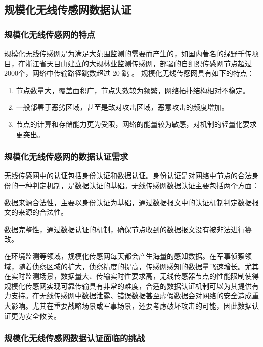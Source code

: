 \subsection{规模化无线传感网数据认证}
\subsubsection{规模化无线传感网的特点}
规模化无线传感网是为满足大范围监测的需要而产生的，如国内著名的绿野千传项目，在浙江省天目山建立的大规林业监测传感网，部署的自组织传感网节点超过2000个，网络中传输路径跳数超过 20 跳
。
规模化无线传感网具有如下的特点：
\begin{enumerate}\setlength{\itemsep}{-\itemsep}
  \item 节点数量大，覆盖面积广，节点失效较为频繁，网络拓扑结构相对不稳定。
  \item 一般部署于恶劣区域，甚至是敌对攻击区域，恶意攻击的频度增加。
  \item 节点的计算和存储能力更为受限，网络的能量较为敏感，对机制的轻量化要求更突出。
\end{enumerate}

\subsubsection{规模化无线传感网的数据认证需求}
无线传感网中的认证包括身份认证和数据认证。身份认证是对网络中节点的合法身份的一种判定机制，是数据认证的基础。无线传感网数据认证主要包括两个方面：
\begin{compactitem}
  \item 数据来源合法性，主要以身份认证为基础，通过数据报文中的认证机制判定数据报文的来源的合法性。
  \item 数据完整性，通过数据认证的机制，确保节点收到的数据报文没有被非法进行篡改。
\end{compactitem}

在环境监测等领域，规模化传感网每天都会产生海量的感知数据。在军事侦察领域，随着侦察区域的扩大，侦察精度的提高，传感网感知的数据量飞速增长。尤其在实时监测场景，数据量大、传输实时性要求高，无线传感器节点的性能限制使得规模化传感网实现可靠传输具有非常的难度，合适的数据认证机制可以为其提供有力支持。在无线传感网中数据泄露、错误数据甚至虚假数据会对网络的安全造成重大影响。尤其在重要战略场景或军事场景，还要考虑破坏攻击的可能，因此数据认证更为安全攸关。
\subsubsection{规模化无线传感网数据认证面临的挑战}

